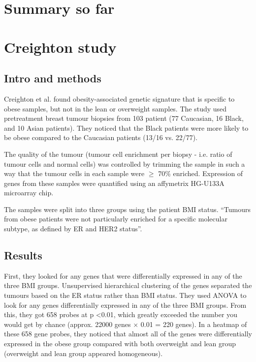 \documentclass[a4paper, 11pt]{article}
\begin{document}
\section*{Summary so far}

\section*{Creighton study}

\subsection*{Intro and methods}

Creighton et al. found obesity-associated genetic signature that is specific to obese samples, but not in the lean or overweight samples.
The study used pretreatment breast tumour biopsies from 103 patient (77 Caucasian, 16 Black, and 10 Asian patients).
They noticed that the Black patients were more likely to be obese compared to the Caucasian patients (13/16 vs. 22/77).

The quality of the tumour (tumour cell enrichment per biopsy - i.e. ratio of tumour cells and normal cells) was controlled by trimming the sample in such a way that the tumour cells in each sample were $\geq$ 70\% enriched.
Expression of genes from these samples were quantified using an affymetrix HG-U133A microarray chip.

The samples were split into three groups using the patient BMI status.
``Tumours from obese patients were not particularly enriched for a specific molecular subtype, as defined by ER and HER2 status''.

\subsection*{Results}

First, they looked for any genes that were differentially expressed in any of the three BMI groups.
Unsupervised hierarchical clustering of the genes separated the tumours based on the ER status rather than BMI status.
They used ANOVA to look for any genes differentially expressed in any of the three BMI groups.
From this, they got 658 probes at p \textless 0.01, which greatly exceeded the number you would get by chance (approx. 22000 genes $\times$ 0.01 = 220 genes).
In a heatmap of these 658 gene probes, they noticed that almost all of the genes were differentially expressed in the obese group compared with both overweight and lean group (overweight and lean group appeared homogeneous).
\end{document}
